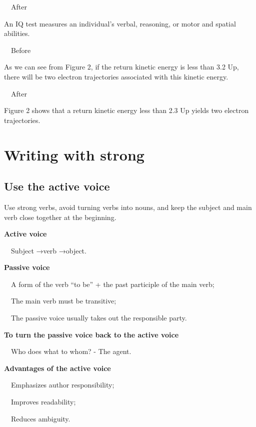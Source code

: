 \documentclass[a4paper, 12pt]{article}
\begin{document}
\par\ \textbullet\ After
\par An IQ test measures an individual's verbal, reasoning, or motor and spatial abilities.

\par\ \textbullet\ Before
\par As we can see from Figure 2, if the return kinetic energy is less than 3.2 Up, there will be two electron trajectories associated with this kinetic energy.

\par\ \textbullet\ After
\par Figure 2 shows that a return kinetic energy less than 2.3 Up yields two electron trajectories.

\newpage\section{Writing with strong}

\subsection{Use the active voice}

Use strong verbs, avoid turning verbs into nouns, and keep the subject and main verb close together at the beginning.

\par\textbf{Active voice}
\par\ \textbullet\ Subject \quad→\quad verb \quad→\quad object.

\par\textbf{Passive voice}
\par\ \textbullet\ A form of the verb ``to be'' + the past participle of the main verb;
\par\ \textbullet\ The main verb must be transitive;
\par\ \textbullet\ The passive voice usually takes out the responsible party.

\par\textbf{To turn the passive voice back to the active voice}
\par\ \textbullet\ Who does what to whom? - The agent.

\par\textbf{Advantages of the active voice}
\par\ \textbullet\ Emphasizes author responsibility;
\par\ \textbullet\ Improves readability;
\par\ \textbullet\ Reduces ambiguity.
\end{document}
